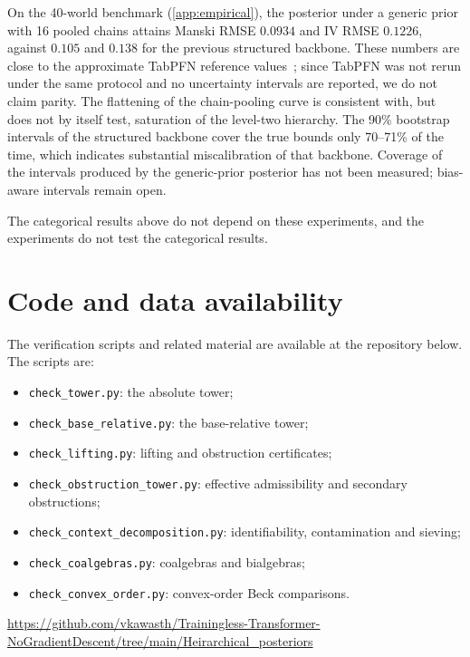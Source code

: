 \documentclass[11pt]{article}
\theoremstyle{definition}
\theoremstyle{remark}
\begin{document}
On the 40-world benchmark (\cref{app:empirical}), the posterior under a generic prior with 16 pooled
chains attains Manski RMSE $0.0934$ and IV RMSE $0.1226$, against $0.105$ and $0.138$ for the
previous structured backbone. These numbers are close to the approximate TabPFN reference
values~\cite{Hollmann2023}; since TabPFN was not rerun under the same protocol and no uncertainty
intervals are reported, we do not claim parity. The flattening of the chain-pooling curve is
consistent with, but does not by itself test, saturation of the level-two hierarchy. The 90\%
bootstrap intervals of the structured backbone cover the true bounds only 70--71\% of the time, which
indicates substantial miscalibration of that backbone. Coverage of the intervals produced by the
generic-prior posterior has not been measured; bias-aware intervals remain open.

The categorical results above do not depend on these experiments, and the experiments do not test
the categorical results.

\section{Code and data availability}

The verification scripts and related material are available at the repository below. The scripts
are:
\begin{itemize}[leftmargin=*,nosep]
\item \texttt{check\_tower.py}: the absolute tower;
\item \texttt{check\_base\_relative.py}: the base-relative tower;
\item \texttt{check\_lifting.py}: lifting and obstruction certificates;
\item \texttt{check\_obstruction\_tower.py}: effective admissibility and secondary obstructions;
\item \texttt{check\_context\_decomposition.py}: identifiability, contamination and sieving;
\item \texttt{check\_coalgebras.py}: coalgebras and bialgebras;
\item \texttt{check\_convex\_order.py}: convex-order Beck comparisons.
\end{itemize}
\begin{center}\small\url{https://github.com/vkawasth/Trainingless-Transformer-NoGradientDescent/tree/main/Heirarchical_posteriors}\end{center}
\end{document}
